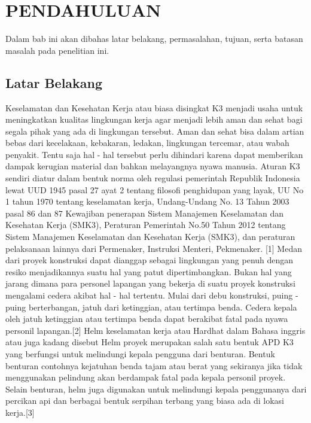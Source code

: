 \chapter{PENDAHULUAN}
\label{chap:pendahuluan}


Dalam bab ini akan dibahas latar belakang, permasalahan, tujuan, serta batasan masalah pada penelitian ini.

\section{Latar Belakang}
\label{sec:latarbelakang}

Keselamatan dan Kesehatan Kerja atau biasa disingkat K3 menjadi usaha untuk meningkatkan kualitas lingkungan kerja agar menjadi lebih aman dan sehat bagi segala pihak yang ada di lingkungan tersebut. Aman dan sehat bisa dalam artian bebas dari kecelakaan, kebakaran, ledakan, lingkungan tercemar, atau wabah penyakit. Tentu saja hal - hal tersebut perlu dihindari karena dapat memberikan dampak kerugian material dan bahkan melayangnya nyawa manusia. Aturan K3 sendiri diatur dalam bentuk norma oleh regulasi pemerintah Republik Indonesia lewat UUD 1945 pasal 27 ayat 2 tentang filosofi penghidupan yang layak, UU No 1 tahun 1970 tentang keselamatan kerja, Undang-Undang No. 13 Tahun 2003 pasal 86 dan 87 Kewajiban penerapan Sistem Manajemen Keselamatan dan Kesehatan Kerja (SMK3), Peraturan Pemerintah No.50 Tahun 2012 tentang Sistem Manajemen Keselamatan dan Kesehatan Kerja (SMK3), dan peraturan pelaksanaan lainnya dari Permenaker, Instruksi Menteri, Pekmenaker.  [1]
Medan dari proyek konstruksi dapat dianggap sebagai lingkungan yang penuh dengan resiko menjadikannya suatu hal yang patut dipertimbangkan. Bukan hal yang jarang dimana para personel lapangan yang bekerja di suatu proyek konstruksi mengalami cedera akibat hal - hal tertentu. Mulai dari debu konstruksi, puing - puing berterbangan, jatuh dari ketinggian, atau tertimpa benda. Cedera kepala oleh jatuh ketinggian atau tertimpa benda dapat berakibat fatal pada nyawa personil lapangan.[2]
Helm keselamatan kerja atau Hardhat dalam Bahasa inggris atau juga kadang disebut Helm proyek merupakan salah satu bentuk APD K3 yang berfungsi untuk melindungi kepala pengguna dari benturan. Bentuk benturan contohnya kejatuhan benda tajam atau berat yang sekiranya jika tidak menggunakan pelindung akan berdampak fatal pada kepala personil proyek. Selain benturan, helm juga digunakan untuk melindungi kepala penggunanya dari percikan api dan berbagai bentuk serpihan terbang yang biasa ada di lokasi kerja.[3]
